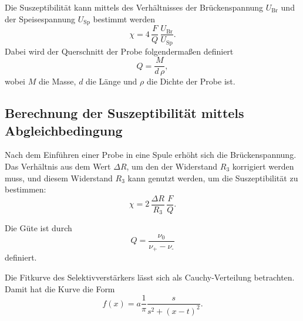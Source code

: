 \noindent Die Suszeptibilität kann mittels des Verhältnisses der Brückenspannung $U_\text{Br}$
und der Speisespannung $U_\text{Sp}$ bestimmt werden
\begin{equation}
    \chi = 4 \, \frac{F}{Q} \, \frac{U_\text{Br}}{U_\text{Sp}}.
    \label{eqn:chiexp1}
\end{equation}
Dabei wird der Querschnitt der Probe folgendermaßen definiert
\begin{equation*}
    Q = \frac{M}{d \, \rho},
\end{equation*}
wobei $M$ die Masse, $d$ die Länge und $\rho$ die Dichte der Probe ist.


\subsection{Berechnung der Suszeptibilität mittels Abgleichbedingung}
Nach dem Einführen einer Probe in eine Spule erhöht sich die Brückenspannung.
Das Verhältnis aus dem Wert $\Delta R$, um den der Widerstand $R_3$ korrigiert werden
muss, und diesem Widerstand $R_3$ kann genutzt werden, um die Suszeptibilität zu 
bestimmen:
\begin{equation}
    \chi = 2 \, \frac{\Delta R}{R_3} \, \frac{F}{Q}.
    \label{eqn:chiexp2}
\end{equation}

Die Güte ist durch
\begin{equation}
    Q = \frac{\nu_0}{\nu_\text{+} - \nu_\text{-}}
    \label{eqn:guete}
\end{equation}
definiert.

Die Fitkurve des Selektivverstärkers lässt sich als Cauchy-Verteilung betrachten. Damit hat die Kurve die Form 
\begin{equation}
    f(x) = a \frac{1}{\pi} \frac{s}{s^2 + (x-t)^2}.
    \label{cauchyverteilung}
\end{equation}
